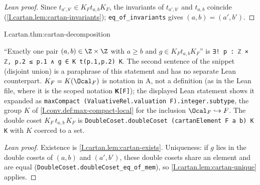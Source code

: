 \begin{proof}[Lean proof]
Since $t_{a',b'}\in K_Ft_{a,b}K_F$, the invariants of $t_{a',b'}$ and $t_{a,b}$ coincide (\cref{I.cartan.lem:cartan-invariants}); \texttt{eq\_of\_invariants} gives $(a,b)=(a',b')$.
\end{proof}

\begin{theorem}
\end{theorem}
\begin{tfformal}{I.cartan.thm:cartan-decomposition}
\begin{tffidelity}
``Exactly one pair $(a,b)\in\Z\times\Z$ with $a\ge b$ and $g\in K_Ft_{a,b}K_F$'' is \texttt{∃! p : ℤ × ℤ, p.2 ≤ p.1 ∧ g ∈ K t(p.1,p.2) K}. The second sentence of the snippet (disjoint union) is a paraphrase of this statement and has no separate Lean counterpart. $K_F=K(\Ocal_F)$ is notation in A, not a definition (as in the Lean file, where it is the scoped notation \texttt{𝐊[F]}); the displayed Lean statement shows it expanded as \texttt{maxCompact (ValuativeRel.valuation F).integer.subtype}, the group $K$ of \cref{I.conv.def:max-compact-local} for the inclusion $\Ocal_F\hookrightarrow F$. The double coset $K_F\,t_{a,b}\,K_F$ is \texttt{DoubleCoset.doubleCoset (cartanElement F a b) K K} with $K$ coerced to a set.
\end{tffidelity}
\end{tfformal}
\begin{proof}[Lean proof]
Existence is \cref{I.cartan.lem:cartan-exists}. Uniqueness: if $g$ lies in the double cosets of $(a,b)$ and $(a',b')$, these double cosets share an element and are equal (\texttt{DoubleCoset.doubleCoset\_eq\_of\_mem}), so \cref{I.cartan.lem:cartan-unique} applies.
\end{proof}

